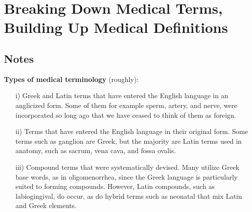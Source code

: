 %
%
%
\chapter{Breaking Down Medical Terms, Building Up Medical Definitions}
\label{BreakDown} %








\abstract{}


\section{Notes}
\label{sec:NOTE1}

\textbf{Types of medical terminology} (roughly):

\begin{itemize}
    \item[i)] Greek and Latin terms that have entered the English language in an anglicized form. Some of them for example sperm, artery, and nerve, were incorporated so long ago that we have ceased to think of them as foreign.
    \item[ii)] Terms that have entered the English language in their original form. Some terms such as ganglion are Greek, but the majority are Latin terms used in anatomy, such as sacrum, vena cava, and fossa ovalis.
    \item[iii)] Compound terms that were systematically devised. Many utilize Greek base words, as in oligomenorrhea, since the Greek language is particularly suited to forming compounds. However, Latin compounds, such as labiogingival, do occur, as do hybrid terms such as neonatal that mix Latin and Greek elements.
\end{itemize}



